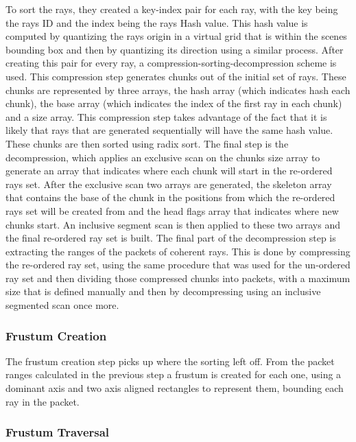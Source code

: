 \medskip

To sort the rays, they created a key-index pair for each ray, with the key being the rays ID and the index being the rays Hash value. This hash value is computed by quantizing the rays origin in a virtual grid that is within the scenes bounding box and then by quantizing its direction using a similar process.
After creating this pair for every ray, a compression-sorting-decompression scheme is used. This compression step generates chunks out of the initial set of rays. These chunks are represented by three arrays, the hash array (which indicates hash each chunk), the base array (which indicates the index of the first ray in each chunk) and a size array. This compression step takes advantage of the fact that it is likely that rays that are generated sequentially will have the same hash value. These chunks are then sorted using radix sort. The final step is the decompression, which applies an exclusive scan on the chunks size array to generate an array that indicates where each chunk will start in the re-ordered rays set.
After the exclusive scan two arrays are generated, the skeleton array that contains the base of the chunk in the positions from which the re-ordered rays set will be created from and the head flags array that indicates where new chunks start. An inclusive segment scan is then applied to these two arrays and the final re-ordered ray set is built. The final part of the decompression step is extracting the ranges of the packets of coherent rays. This is done by compressing the re-ordered ray set, using the same procedure that was used for the un-ordered ray set and then dividing those compressed chunks into packets, with a maximum size that is defined manually and then by decompressing using an inclusive segmented scan once more.

\subsubsection{Frustum Creation}

The frustum creation step picks up where the sorting left off. From the packet ranges calculated in the previous step a frustum is created for each one, using a dominant axis and two axis aligned rectangles to represent them, bounding each ray in the packet.

\subsubsection{Frustum Traversal}

